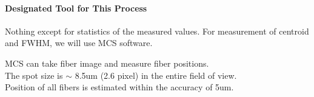 \paragraph{Designated Tool for This Process}
Nothing except for statistics of the measured values.
For measurement of centroid and FWHM, we will use MCS software.


\begin{itembox}[l]{}
MCS can take fiber image and measure fiber positions. \\
The spot size is $\sim$ 8.5um (2.6 pixel) in the entire field of view. \\
Position of all fibers is estimated within the accuracy of 5um.

\end{itembox}